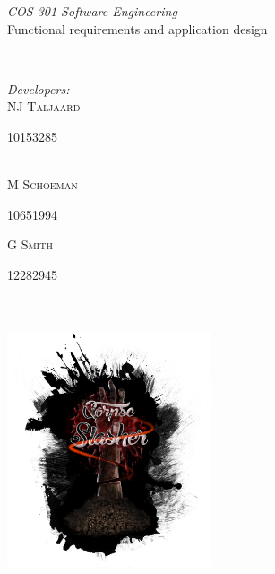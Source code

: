 \documentclass[letterpaper]{article}
\makeatletter
\def\printauthor{%
    {\large \@author}}
\makeatother
\begin{document}
\begin{titlepage}
\begin{center}
\begin{minipage}{0.4\textwidth}
\begin{flushleft} \large
\emph{COS 301 Software Engineering}\\
\vspace{1cm}
Functional requirements and application design
\end{flushleft}
\end{minipage}
~
\begin{minipage}{0.4\textwidth}
	\begin{flushright} \large
	\emph{Developers:} \\
		NJ \textsc{Taljaard} \\
			\begin{small}
				10153285
			\end{small} \\
		M  \textsc{Schoeman} \\
			\begin{small}
				10651994 \\
			\end{small}
		G  \textsc{Smith} \\
			\begin{small}
				12282945
			\end{small}
	\end{flushright}
\end{minipage}\\



\includegraphics[width=60mm, height=80mm]{corpseslasher.png}\\ %
 
\end{center}
\vfill %

\end{titlepage}
\end{document}
